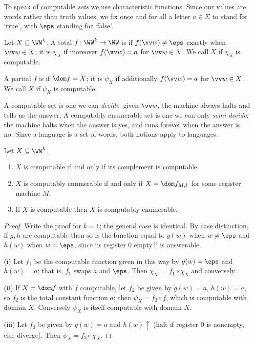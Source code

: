 To speak of computable \emph{sets} we use characteristic functions. Since our values are words rather than truth values, we fix once and for all a letter $a \in \Sigma$ to stand for `true', with $\eps$ standing for `false'.

\begin{definition}
	Let $X \subseteq \WW^k$. A total $f \colon \WW^k \to \WW$ is  if $f(\vv w) \neq \eps$ exactly when $\vv w \in X$; it is  $\chi_X$ if moreover $f(\vv w) = a$ for $\vv w \in X$. We call $X$  if $\chi_X$ is computable.

	A partial $f$ is  if $\dom f = X$; it is  $\psi_X$ if additionally $f(\vv w) = a$ for $\vv w \in X$. We call $X$  if $\psi_X$ is computable.
\end{definition}

A computable set is one we can \emph{decide}: given $\vv w$, the machine always halts and tells us the answer. A computably enumerable set is one we can only \emph{semi-decide}: the machine halts when the answer is yes, and runs forever when the answer is no. Since a language is a set of words, both notions apply to languages.

\begin{proposition}\label{prop:cecomputable}
	Let $X \subseteq \WW^k$.
	\begin{enumerate}[label=(\roman*)]
		\item $X$ is computable if and only if its complement is computable.
		\item $X$ is computably enumerable if and only if $X = \dom f_{M,k}$ for some register machine $M$.
		\item If $X$ is computable then $X$ is computably enumerable.
	\end{enumerate}
\end{proposition}

\begin{proof}
	Write the proof for $k = 1$; the general case is identical. By case distinction, if $g,h$ are computable then so is the function equal to $g(w)$ when $w \neq \eps$ and $h(w)$ when $w = \eps$, since `is register $0$ empty?' is answerable.

	(i) Let $f_1$ be the computable function given in this way by $g(w) = \eps$ and $h(w) = a$; that is, $f_1$ swaps $a$ and $\eps$. Then $\chi_{X^c} = f_1 \circ \chi_X$ and conversely.

	(ii) If $X = \dom f$ with $f$ computable, let $f_2$ be given by $g(w) = a$, $h(w) = a$, so $f_2$ is the total constant function $a$; then $\psi_X = f_2 \circ f$, which is computable with domain $X$. Conversely $\psi_X$ is itself computable with domain $X$.

	(iii) Let $f_3$ be given by $g(w) = a$ and $h(w) \uparrow$ (halt if register $0$ is nonempty, else diverge). Then $\psi_X = f_3 \circ \chi_X$.
\end{proof}

